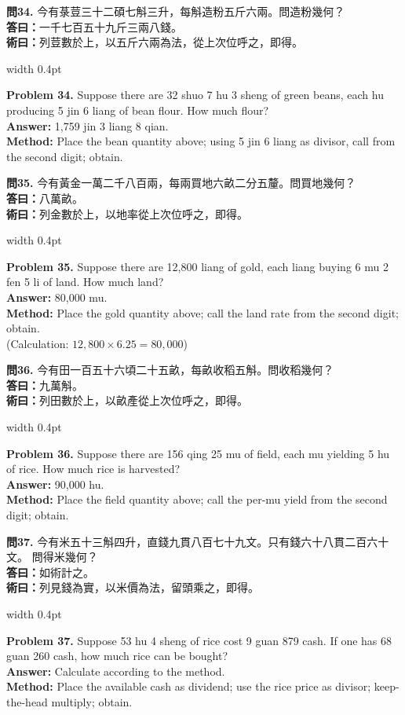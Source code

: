 \documentclass[10pt,a4paper]{article}
\newlength{\cnwidth}
\newlength{\enwidth}
\newcommand{\bilingual}[2]{%
  \noindent%
  \begin{minipage}[t]{\cnwidth}%
    #1%
  \end{minipage}%
  \hfill\vrule width 0.4pt\hfill%
  \begin{minipage}[t]{\enwidth}%
    #2%
  \end{minipage}%
  \par\smallskip%
}
\begin{document}
\bilingual{%
  \textbf{問34.}
  今有菉荳三十二碩七斛三升，每斛造粉五斤六兩。問造粉幾何？\\
  \textbf{答曰：}一千七百五十九斤三兩八錢。\\
  \textbf{術曰：}列荳數於上，以五斤六兩為法，從上次位呼之，即得。
}{%
  \textbf{Problem 34.}
  Suppose there are 32 shuo 7 hu 3 sheng of green beans, each hu producing
  5 jin 6 liang of bean flour. How much flour?\\
  \textbf{Answer:} 1,759 jin 3 liang 8 qian.\\
  \textbf{Method:} Place the bean quantity above; using 5 jin 6 liang as divisor,
  call from the second digit; obtain.
}

\bilingual{%
  \textbf{問35.}
  今有黃金一萬二千八百兩，每兩買地六畝二分五釐。問買地幾何？\\
  \textbf{答曰：}八萬畝。\\
  \textbf{術曰：}列金數於上，以地率從上次位呼之，即得。
}{%
  \textbf{Problem 35.}
  Suppose there are 12,800 liang of gold, each liang buying 6 mu 2 fen 5 li
  of land. How much land?\\
  \textbf{Answer:} 80,000 mu.\\
  \textbf{Method:} Place the gold quantity above; call the land rate from the
  second digit; obtain.\\
  (Calculation: $12{,}800 \times 6.25 = 80{,}000$)
}

\bilingual{%
  \textbf{問36.}
  今有田一百五十六頃二十五畝，每畝收稻五斛。問收稻幾何？\\
  \textbf{答曰：}九萬斛。\\
  \textbf{術曰：}列田數於上，以畝產從上次位呼之，即得。
}{%
  \textbf{Problem 36.}
  Suppose there are 156 qing 25 mu of field, each mu yielding 5 hu of rice.
  How much rice is harvested?\\
  \textbf{Answer:} 90,000 hu.\\
  \textbf{Method:} Place the field quantity above; call the per-mu yield from
  the second digit; obtain.
}

\bilingual{%
  \textbf{問37.}
  今有米五十三斛四升，直錢九貫八百七十九文。只有錢六十八貫二百六十文。
  問得米幾何？\\
  \textbf{答曰：}如術計之。\\
  \textbf{術曰：}列見錢為實，以米價為法，留頭乘之，即得。
}{%
  \textbf{Problem 37.}
  Suppose 53 hu 4 sheng of rice cost 9 guan 879 cash.
  If one has 68 guan 260 cash, how much rice can be bought?\\
  \textbf{Answer:} Calculate according to the method.\\
  \textbf{Method:} Place the available cash as dividend; use the rice price as
  divisor; keep-the-head multiply; obtain.
}
\end{document}
